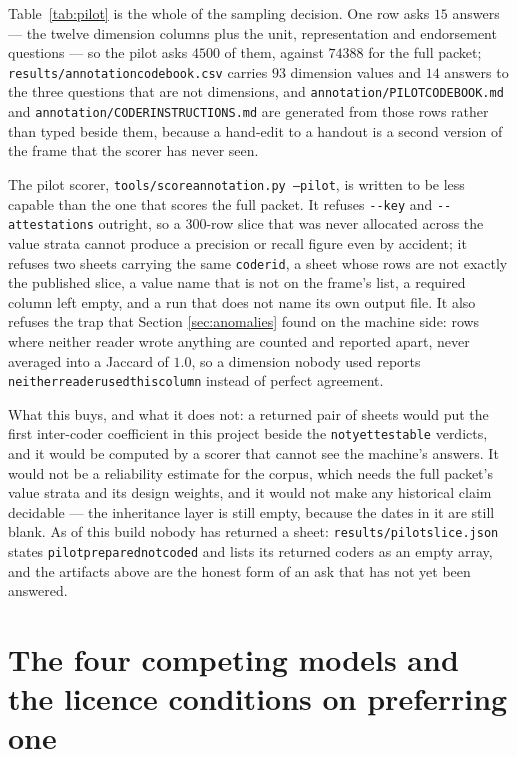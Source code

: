 \documentclass[11pt]{article}
\DeclareRobustCommand{\_}{\textunderscore\allowbreak}
\begin{document}
Table~\ref{tab:pilot} is the whole of the sampling decision. One row asks
\(15\) answers --- the twelve dimension columns plus the unit, representation and
endorsement questions --- so the pilot asks \(4500\) of them, against \(74388\) for the full
packet; \texttt{results/annotation\_codebook.csv} carries \(93\) dimension values and \(14\)
answers to the three questions that are not dimensions, and
\texttt{annotation/PILOT\_CODEBOOK.md} and \texttt{annotation/CODER\_INSTRUCTIONS.md} are
generated from those rows rather than typed beside them, because a hand-edit to a handout is
a second version of the frame that the scorer has never seen.

The pilot scorer, \texttt{tools/score\_annotation.py --pilot}, is written to be less capable
than the one that scores the full packet. It refuses \texttt{-{}-key} and
\texttt{-{}-attestations} outright, so a 300-row slice that was never allocated across the
value strata cannot produce a precision or recall figure even by accident; it refuses two
sheets carrying the same \texttt{coder\_id}, a sheet whose rows are not exactly the published
slice, a value name that is not on the frame's list, a required column left empty, and a run
that does not name its own output file. It also refuses the trap that Section
\ref{sec:anomalies} found on the machine side: rows where neither reader wrote anything are
counted and reported apart, never averaged into a Jaccard of \(1.0\), so a dimension nobody
used reports \texttt{neither\_reader\_used\_this\_column} instead of perfect agreement.

What this buys, and what it does not: a returned pair of sheets would put the first
inter-coder coefficient in this project beside the \texttt{not\_yet\_testable} verdicts, and
it would be computed by a scorer that cannot see the machine's answers. It would not be a
reliability estimate for the corpus, which needs the full packet's value strata and its
design weights, and it would not make any historical claim decidable --- the inheritance
layer is still empty, because the dates in it are still blank. As of this build nobody has
returned a sheet: \texttt{results/pilot\_slice.json} states
\texttt{pilot\_prepared\_not\_coded} and lists its returned coders as an empty array, and the
artifacts above are the honest form of an ask that has not yet been answered.

\section{The four competing models and the licence conditions on preferring one}
\label{sec:models}
\end{document}
